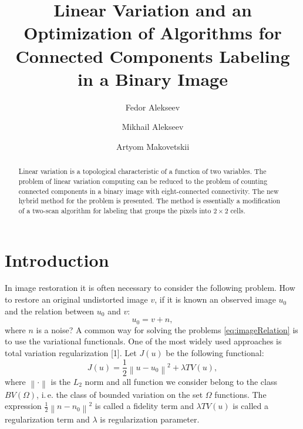 \documentclass{llncs}
\newcommand{\norm}[1]{\left\lVert#1\right\rVert}
\begin{document}
\title{Linear Variation and an Optimization of Algorithms for Connected
Components Labeling in a Binary Image}

\author{Fedor Alekseev \and Mikhail Alekseev
\and Artyom Makovetskii}


\maketitle              %

\begin{abstract}
Linear variation is a topological characteristic of a function of two variables.
The problem of linear variation computing can be reduced to the problem
of counting connected components in a binary image with eight-connected connectivity.
The new hybrid method for the problem is presented.
The method is essentially a modification of a two-scan algorithm for labeling
that groups the pixels into $2 \times 2$ cells.

\end{abstract}

\section{Introduction}


In image restoration it is often necessary to consider the following problem.
How to restore an original undistorted image $v$, if it is known an observed
image $u_0$ and the relation between $u_0$ and $v$:
\begin{equation}
  u_0=v+n,
  \label{eq:imageRelation}
\end{equation}
where $n$ is a noise?
A common way for solving the problems \eqref{eq:imageRelation} is to use the
variational functionals.
One of the most widely used approaches is total variation
regularization [1]. %
Let $J(u)$ be the following functional:
\begin{equation}
  J(u) = \frac12 \norm{u - u_0}^2 + \lambda TV(u),
  \label{eq:jFunctional}
\end{equation}
where $\norm{\cdot}$ is the $L_2$ norm and all function we consider belong to the class
$BV(\Omega)$, i.\,e. the class of bounded variation on the set $\Omega$ functions.
%
The expression $\frac12 \norm{n-n_0}^2$ is called a fidelity term and
$\lambda TV(u)$ is called a regularization term and $\lambda$ is regularization
parameter.
\end{document}
